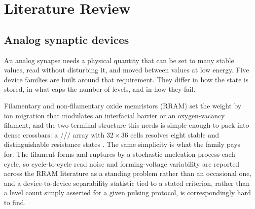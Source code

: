 \section{Literature Review}
\label{sec:lit}

\subsection{Analog synaptic devices}

An analog synapse needs a physical quantity that can be set to many stable values, read
without disturbing it, and moved between values at low energy. Five device families are
built around that requirement. They differ in how the state is stored, in what caps the
number of levels, and in how they fail.

Filamentary and non-filamentary oxide memristors (RRAM) set the weight by ion migration
that modulates an interfacial barrier or an oxygen-vacancy filament, and the two-terminal
structure this needs is simple enough to pack into dense crossbars: a
/// array with $32\times36$ cells resolves eight stable
and distinguishable resistance states \cite{Hu2025_Sensors}. The same simplicity is what
the family pays for. The filament forms and ruptures by a stochastic nucleation
process each cycle, so cycle-to-cycle read noise and forming-voltage variability are
reported across the RRAM literature as a standing problem rather than an occasional one,
and a device-to-device separability statistic tied to a stated criterion, rather than a
level count simply asserted for a given pulsing protocol, is correspondingly hard to
find.

